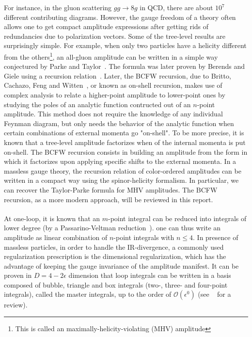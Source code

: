 For instance, in the gluon scattering $gg\rightarrow 8g$ in QCD, there are about $10^7$ different contributing diagrams.
However, the gauge freedom of a theory often allows one to get compact amplitude expressions after getting rids of redundancies due to polarization vectors.
Some of the tree-level results are surprisingly simple.
For example, when only two particles have a helicity different from the others\footnote{This is called an maximally-helicity-violating (MHV) amplitude}, an all-gluon amplitude can be written in a simple way conjectured by Parke and Taylor~\cite{PhysRevLett.56.2459}.
%
The formula was later proven by Berends and Giele using a recursion relation~\cite{BERENDS1988759,KOSOWER199023}.
Later, the BCFW recursion, due to Britto, Cachazo, Feng and Witten~\cite{BRITTO2005499, PhysRevLett.94.181602}, or known as on-shell recursion, makes use of complex analysis to relate a higher-point amplitude to lower-point ones by studying the poles of an analytic function contructed out of an $n$-point amplitude.
This method does not require the knowledge of any individual Feynman diagram, but only needs the behavior of the analytic function when certain combinations of external momenta go "on-shell". 
%
To be more precise, it is known that a tree-level amplitude factorizes when of the internal momenta is put on-shell.
%
The BCFW recursion consists in building an amplitude from the form in which it factorizes upon applying specific shifts to the external momenta.
%
In a massless gauge theory, the recursion relation of color-ordered amplitudes can be written in a compact way using the spinor-helicity formalism.
%
In particular, we can recover the Taylor-Parke formula for MHV amplitudes.
The BCFW recursion, as a more modern approach, will be reviewed in this report.
\\\\
At one-loop,
it is known that an $m$-point integral can be reduced into integrals of lower degree (\eg by a Passarino-Veltman reduction~\cite{PASSARINO1979151}). 
one can thus write an amplitude as linear combination of $n$-point integrals with $n\leq 4$.
In presence of massless particles, in order to handle the IR-divergence, a commonly used regularization prescription is the dimensional regularization, which has the advantage of keeping the gauge invariance of the amplitude manifest.
It can be proven in $D = 4-2\epsilon$ dimension that loop integrals can be written in a basis composed of bubble, triangle and box integrals (\ie two-, three- and four-point integrals), called the master integrals, up to the order of $\mathcal{O}(\epsilon^0)$ (see \eg~\cite{Gluza:2010ws} for a review).
